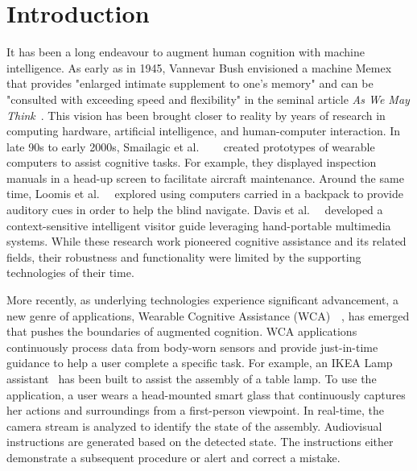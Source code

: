 \chapter{Introduction}
\label{chapter: intro}

It has been a long endeavour to augment human cognition with machine
intelligence. As early as in 1945, Vannevar Bush envisioned a machine Memex that
provides "enlarged intimate supplement to one's memory" and can be "consulted
with exceeding speed and flexibility" in the seminal article \textit{As We May
Think}~\cite{bush1945we}. This vision has been brought closer to reality by
years of research in computing hardware, artificial intelligence, and
human-computer interaction. In late 90s to early 2000s, Smailagic et al.
~\cite{smailagic1993case}~\cite{smailagic1998very}~\cite{smailagic2002application}
created prototypes of wearable computers to assist cognitive tasks. For example,
they displayed inspection manuals in a head-up screen to facilitate aircraft
maintenance. Around the same time, Loomis et
al.~\cite{loomis1998navigation}~\cite{loomis1994personal} explored using
computers carried in a backpack to provide auditory cues in order to help the
blind navigate.  Davis et
al.~\cite{davies1998developing}~\cite{cheverst2000developing} developed a
context-sensitive intelligent visitor guide leveraging hand-portable multimedia
systems. While these research work pioneered cognitive assistance and its
related fields, their robustness and functionality were limited by the
supporting technologies of their time.

More recently, as underlying technologies experience significant advancement, a
new genre of applications, Wearable Cognitive Assistance
(WCA)~\cite{ha2014towards}~\cite{chen2018application}, has emerged that pushes
the boundaries of augmented cognition. WCA applications continuously process
data from body-worn sensors and provide just-in-time guidance to help a user
complete a specific task. For example, an IKEA Lamp
assistant~\cite{chen2018application} has been built to assist the assembly of a
table lamp. To use the application, a user wears a head-mounted smart glass that
continuously captures her actions and surroundings from a first-person
viewpoint. In real-time, the camera stream is analyzed to identify the state of
the assembly. Audiovisual instructions are generated based on the detected
state. The instructions either demonstrate a subsequent procedure or alert and
correct a mistake.

